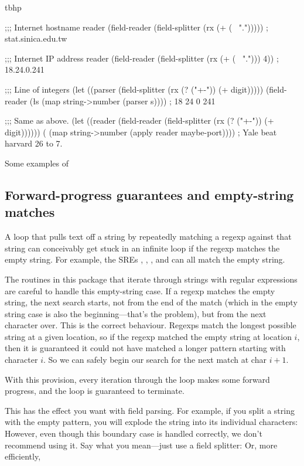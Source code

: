 \begin{desc}
\begin{boxedfigure}{tbhp}
\begin{centercode}
;;; Internet hostname reader
(field-reader (field-splitter (rx (+ (~ ".")))))
    ; stat.sinica.edu.tw

;;; Internet IP address reader
(field-reader (field-splitter (rx (+ (~ "."))) 4))
    ; 18.24.0.241

;;; Line of integers
(let ((parser (field-splitter (rx (? ("+-")) (+ digit)))))
  (field-reader (\l{s} (map string->number (parser s))))
    ; 18 24 0 241

;;; Same as above.
(let ((reader (field-reader (field-splitter (rx (? ("+-")) 
                                                (+ digit))))))
  ( (map string->number (apply reader maybe-port))))
    ; Yale beat harvard 26 to 7.\end{centercode}
\caption{Some examples of \protect{}}
\label{fig:field-readers}
\end{boxedfigure}

\end{desc}


\subsection{Forward-progress guarantees and empty-string matches}
A loop that pulls text off a string by repeatedly matching a regexp 
against that string can conceivably get stuck in an infinite loop if 
the regexp matches the empty string. For example, the SREs
, , , and 
can all match the empty string.

The routines in this package that iterate through strings with regular
expressions are careful to handle this empty-string case.
If a regexp matches the empty string, the next search starts, not from
the end of the match (which in the empty string case is also the 
beginning---that's the problem), but from the next character over.
This is the correct behaviour. Regexps match the longest possible
string at a given location, so if the regexp matched the empty string
at location $i$, then it is guaranteed it could not have matched
a longer pattern starting with character $i$. So we can safely begin
our search for the next match at char $i+1$.

With this provision, every iteration through the loop makes some forward
progress, and the loop is guaranteed to terminate.

This has the effect you want with field parsing. For example, if you split
a string with the empty pattern, you will explode the string into its
individual characters:
However, even though this boundary case is handled correctly, we don't
recommend using it. Say what you mean---just use a field splitter:
Or, more efficiently,

